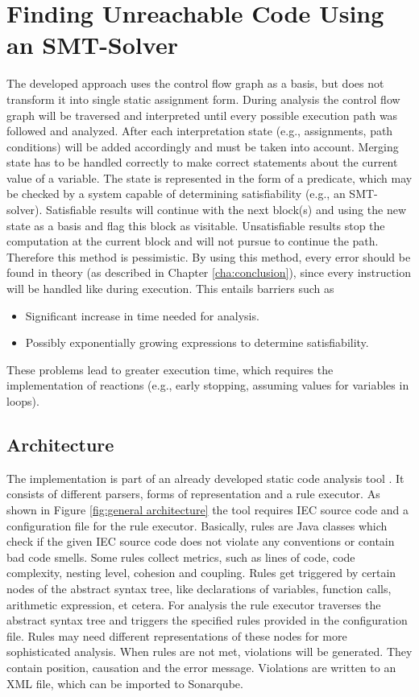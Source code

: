 
\chapter{Finding Unreachable Code Using an SMT-Solver}
\label{cha:finding unreachable code using a smt-solver}

The developed approach uses the control flow graph as a basis, but does not transform it into single static assignment form.
During analysis the control flow graph will be traversed and interpreted until every possible execution path was followed and analyzed.
After each interpretation state (e.g., assignments, path conditions) will be added accordingly and must be taken into account.
Merging state has to be handled correctly to make correct statements about the current value of a variable.
The state is represented in the form of a predicate, which may be checked by a system capable of determining satisfiability (e.g., an SMT-solver).
Satisfiable results will continue with the next block(s) and using the new state as a basis and flag this block as visitable.
Unsatisfiable results stop the computation at the current block and will not pursue to continue the path.
Therefore this method is pessimistic.
By using this method, every error should be found in theory (as described in Chapter \ref{cha:conclusion}), since every instruction will be handled like during execution. 
This entails barriers such as 
\begin{itemize}
	\item Significant increase in time needed for analysis. 
	\item Possibly exponentially growing expressions to determine satisfiability.
\end{itemize}
These problems lead to greater execution time, which requires the implementation of reactions (e.g., early stopping, assuming values for variables in loops).

\section{Architecture}
The implementation is part of an already developed static code analysis tool \cite{Prahofer_2012}. 
It consists of different parsers, forms of representation and a rule executor. 
As shown in Figure \ref{fig:general architecture} the tool requires IEC source code and a configuration file for the rule executor.
Basically, rules are Java classes which check if the given IEC source code does not violate any conventions or contain bad code smells. 
Some rules collect metrics, such as lines of code, code complexity, nesting level, cohesion and coupling.
Rules get triggered by certain nodes of the abstract syntax tree, like declarations of variables, function calls, arithmetic expression, et cetera.
For analysis the rule executor traverses the abstract syntax tree and triggers the specified rules provided in the configuration file.
Rules may need different representations of these nodes for more sophisticated analysis. 
When rules are not met, violations will be generated. They contain position, causation and the error message. Violations are written to an XML file, which can be imported to Sonarqube\cite{sonarqube}.


